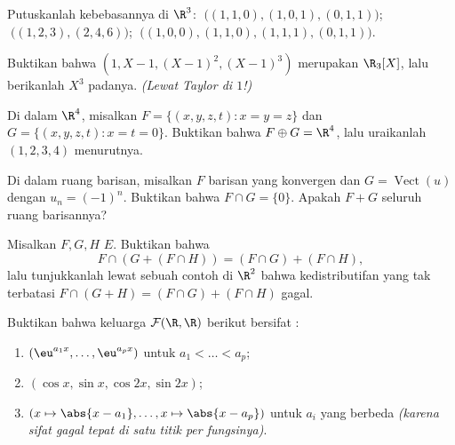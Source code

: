 \begin{exercise}[$\star$]\label{exo:b1:vspaces:3}
Putuskanlah kebebasannya di $\R^3$: $\;\bigl((1,1,0), (1,0,1),
(0,1,1)\bigr)$; $\;\bigl((1,2,3), (2,4,6)\bigr)$;
$\;\bigl((1,0,0), (1,1,0), (1,1,1), (0,1,1)\bigr)$.
\end{exercise}

\begin{exercise}[$\star$]\label{exo:b1:vspaces:4}
Buktikan bahwa $(1, X - 1, (X-1)^2, (X-1)^3)$ merupakan  $\R_3[X]$,
lalu berikanlah  $X^3$ padanya. \emph{(Lewat Taylor di $1$!)}
\end{exercise}

\begin{exercise}[$\star\star$]\label{exo:b1:vspaces:5}
Di dalam $\R^4$, misalkan $F = \{(x,y,z,t) : x = y = z\}$ dan $G = \{(x,y,z,t)
: x = t = 0\}$. Buktikan bahwa $F \oplus G = \R^4$, lalu uraikanlah
$(1,2,3,4)$ menurutnya.
\end{exercise}

\begin{exercise}[$\star\star$]\label{exo:b1:vspaces:6}
Di dalam ruang barisan, misalkan $F$  barisan yang
konvergen dan $G = \operatorname{Vect}(u)$ dengan $u_n = (-1)^n$.
Buktikan bahwa $F \cap G = \{0\}$. Apakah $F + G$ seluruh ruang
barisannya?
\end{exercise}

\begin{exercise}[$\star\star$]\label{exo:b1:vspaces:7}
Misalkan $F, G, H$  $E$. Buktikan bahwa
\[
F \cap (G + (F \cap H)) = (F \cap G) + (F \cap H),
\]
lalu tunjukkanlah lewat sebuah contoh di $\R^2$ bahwa kedistributifan
yang tak terbatasi $F \cap (G + H) = (F\cap G) + (F \cap H)$ gagal.
\end{exercise}

\begin{exercise}[$\star\star\star$]\label{exo:b1:vspaces:8}
Buktikan bahwa keluarga $\mathcal{F}(\R, \R)$ berikut bersifat :
\begin{enumerate}
  \item $(\eu^{a_1 x}, \dots, \eu^{a_p x})$ untuk $a_1 < \dots < a_p$;
  \item $(\cos x, \sin x, \cos 2x, \sin 2x)$;
  \item $(x \mapsto \abs{x - a_1}, \dots, x \mapsto \abs{x - a_p})$
        untuk $a_i$ yang berbeda \emph{(karena sifat  gagal tepat di
        satu titik per fungsinya)}.
\end{enumerate}
\end{exercise}

